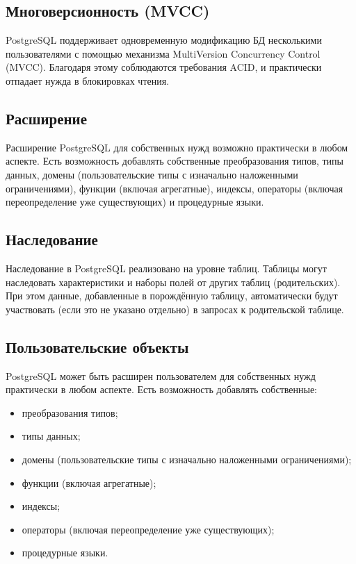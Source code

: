 \subsection{Многоверсионность (MVCC)}\label{subsec:mvcc}

PostgreSQL поддерживает одновременную модификацию БД несколькими пользователями с помощью механизма MultiVersion Concurrency Control (MVCC). Благодаря этому соблюдаются требования ACID, и практически отпадает нужда в блокировках чтения.

\subsection{Расширение}\label{subsec:widening}

Расширение PostgreSQL для собственных нужд возможно практически в любом аспекте. Есть возможность добавлять собственные преобразования типов, типы данных, домены (пользовательские типы с изначально наложенными ограничениями), функции (включая агрегатные), индексы, операторы (включая переопределение уже существующих) и процедурные языки.

\subsection{Наследование}\label{subsec:inheritance}

Наследование в PostgreSQL реализовано на уровне таблиц. Таблицы могут наследовать характеристики и наборы полей от других таблиц (родительских). При этом данные, добавленные в порождённую таблицу, автоматически будут участвовать (если это не указано отдельно) в запросах к родительской таблице.

\subsection{Пользовательские объекты}\label{subsec:user-objects}

PostgreSQL может быть расширен пользователем для собственных нужд практически в любом аспекте. Есть возможность добавлять собственные:
\begin{itemize}
    \item преобразования типов;
    \item типы данных;
    \item домены (пользовательские типы с изначально наложенными ограничениями);
    \item функции (включая агрегатные);
    \item индексы;
    \item операторы (включая переопределение уже существующих);
    \item процедурные языки.\cite{web-creator}
\end{itemize}